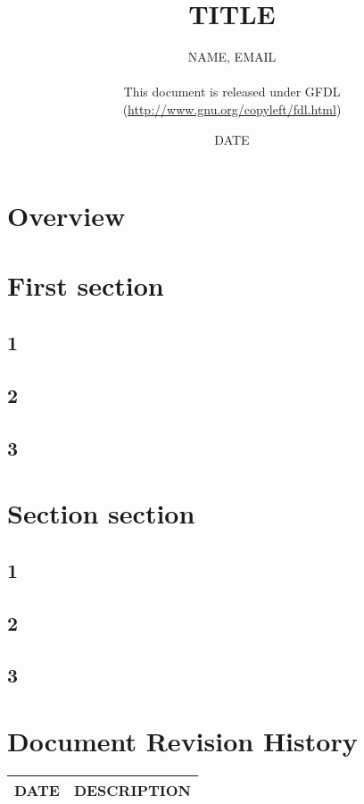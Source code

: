 \documentclass{article}
\title{TITLE}
\author{NAME, EMAIL\\
	\\
	This document is released under GFDL\\ 
	(\url{http://www.gnu.org/copyleft/fdl.html})}
\date{DATE}
\begin{document}
\maketitle
\newpage

\tableofcontents
\newpage


\section{Overview}
\section{First section}
\subsection{1}
\subsection{2}
\subsection{3}

\section{Section section}
\subsection{1}
\subsection{2}
\subsection{3}


\newpage
\section{Document Revision History}

\begin{table}[h]
\begin{tabular}{|l|l|} \hline
DATE & DESCRIPTION \\ \hline

\end{tabular}
\end{table}
\end{document}

